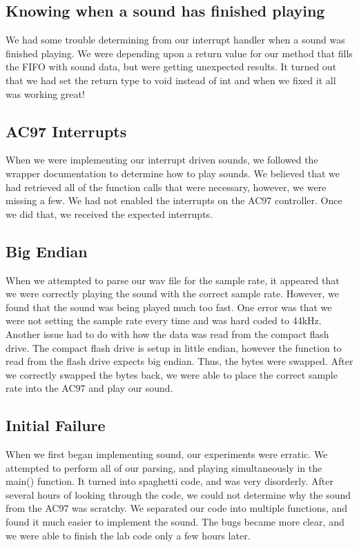 \documentclass[11pt,letter,oneside]{report}
\begin{document}
\subsection{Knowing when a sound has finished playing}
We had some trouble determining from our interrupt handler when a sound was finished playing.  We were depending upon a return value for our method that fills the FIFO with sound data, but were getting unexpected results.  It turned out that we had set the return type to void instead of int and when we fixed it all was working great!

\subsection{AC97 Interrupts}
When we were implementing our interrupt driven sounds, we followed the wrapper documentation to determine how to play sounds. We believed that we had retrieved all of the function calls that were necessary, however, we were missing a few. We had not enabled the interrupts on the AC97 controller. Once we did that, we received the expected interrupts.

\subsection{Big Endian}
When we attempted to parse our wav file for the sample rate, it appeared that we were correctly playing the sound with the correct sample rate. However, we found that the sound was being played much too fast. One error was that we were not setting the sample rate every time and was hard coded to 44kHz. Another issue had to do with how the data was read from the compact flash drive. The compact flash drive is setup in little endian, however the function to read from the flash drive expects big endian. Thus, the bytes were swapped. After we correctly swapped the bytes back, we were able to place the correct sample rate into the AC97 and play our sound.

\subsection{Initial Failure}
When we first began implementing sound, our experiments were erratic. We attempted to perform all of our parsing, and playing simultaneously in the main() function. It turned into spaghetti code, and was very disorderly. After several hours of looking through the code, we could not determine why the sound from the AC97 was scratchy. We separated our code into multiple functions, and found it much easier to implement the sound. The bugs became more clear, and we were able to finish the lab code only a few hours later.
\end{document}
